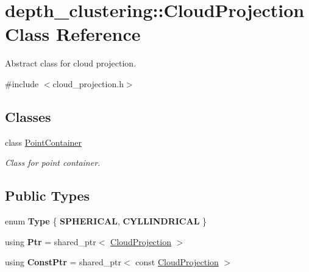 \hypertarget{classdepth__clustering_1_1CloudProjection}{}\section{depth\+\_\+clustering\+:\+:Cloud\+Projection Class Reference}
\label{classdepth__clustering_1_1CloudProjection}


Abstract class for cloud projection.  




{\ttfamily \#include $<$cloud\+\_\+projection.\+h$>$}

\subsection*{Classes}
\begin{DoxyCompactItemize}
\item 
class \hyperlink{classdepth__clustering_1_1CloudProjection_1_1PointContainer}{Point\+Container}
\begin{DoxyCompactList}\small\item\em Class for point container. \end{DoxyCompactList}\end{DoxyCompactItemize}
\subsection*{Public Types}
\begin{DoxyCompactItemize}
\item 
\mbox{\label{classdepth__clustering_1_1CloudProjection_a691e153edbc93d274edfb35683cb17a0}} 
enum {\bfseries Type} \{ {\bfseries S\+P\+H\+E\+R\+I\+C\+AL}, 
{\bfseries C\+Y\+L\+L\+I\+N\+D\+R\+I\+C\+AL}
 \}
\item 
\mbox{\label{classdepth__clustering_1_1CloudProjection_a7ac49f27b97e149be239a777587b4162}} 
using {\bfseries Ptr} = shared\+\_\+ptr$<$ \hyperlink{classdepth__clustering_1_1CloudProjection}{Cloud\+Projection} $>$
\item 
\mbox{\label{classdepth__clustering_1_1CloudProjection_aa7a2a7f37a6ebd5533e336e1f484567a}} 
using {\bfseries Const\+Ptr} = shared\+\_\+ptr$<$ const \hyperlink{classdepth__clustering_1_1CloudProjection}{Cloud\+Projection} $>$
\end{DoxyCompactItemize}
